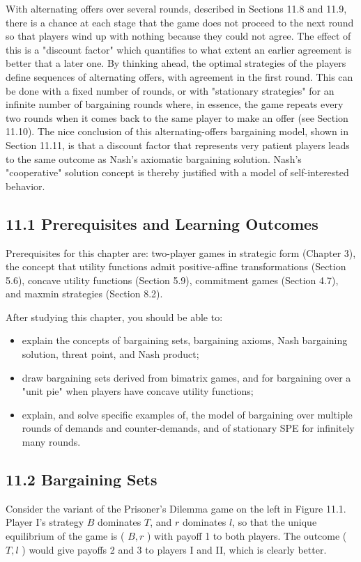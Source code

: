 \documentclass[12pt]{article}
\begin{document}
With alternating offers over several rounds, described in Sections 11.8 and 11.9, there is a chance at each stage that the game does not proceed to the next round so that players wind up with nothing because they could not agree. The effect of this is a "discount factor" which quantifies to what extent an earlier agreement is better that a later one. By thinking ahead, the optimal strategies of the players define sequences of alternating offers, with agreement in the first round. This can be done with a fixed number of rounds, or with "stationary strategies" for an infinite number of bargaining rounds where, in essence, the game repeats every two rounds when it comes back to the same player to make an offer (see Section 11.10). The nice conclusion of this alternating-offers bargaining model, shown in Section 11.11, is that a discount factor that represents very patient players leads to the same outcome as Nash's axiomatic bargaining solution. Nash's "cooperative" solution concept is thereby justified with a model of self-interested behavior.

\subsection*{11.1 Prerequisites and Learning Outcomes}
Prerequisites for this chapter are: two-player games in strategic form (Chapter 3), the concept that utility functions admit positive-affine transformations (Section 5.6), concave utility functions (Section 5.9), commitment games (Section 4.7), and maxmin strategies (Section 8.2).

After studying this chapter, you should be able to:

\begin{itemize}
  \item explain the concepts of bargaining sets, bargaining axioms, Nash bargaining solution, threat point, and Nash product;
  \item draw bargaining sets derived from bimatrix games, and for bargaining over a "unit pie" when players have concave utility functions;
  \item explain, and solve specific examples of, the model of bargaining over multiple rounds of demands and counter-demands, and of stationary SPE for infinitely many rounds.
\end{itemize}

\subsection*{11.2 Bargaining Sets}
Consider the variant of the Prisoner's Dilemma game on the left in Figure 11.1. Player I's strategy $B$ dominates $T$, and $r$ dominates $l$, so that the unique equilibrium of the game is ( $B, r$ ) with payoff 1 to both players. The outcome ( $T, l$ ) would give payoffs 2 and 3 to players I and II, which is clearly better.
\end{document}
